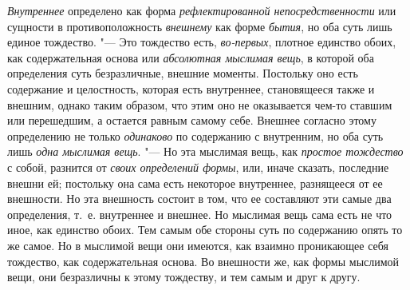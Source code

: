 {\em Внутреннее} определено как форма
{\em рефлектированной непосредственности} или сущности
в противоположность {\em внешнему} как форме
{\em бытия}, но оба суть лишь единое тождество. "--- Это
тождество есть, {\em во-первых}, плотное единство
обоих, как содержательная основа или {\em абсолютная
мыслимая вещь}, в которой оба определения суть безразличные, внешние
моменты. Постольку оно есть содержание и целостность, которая есть
внутреннее, становящееся также и внешним, однако таким образом, что этим
оно не оказывается чем-то ставшим или перешедшим, а остается равным самому
себе. Внешнее согласно этому определению не только
{\em одинаково} по содержанию с внутренним, но оба суть
лишь {\em одна мыслимая вещь}. "--- Но эта мыслимая вещь,
как {\em простое тождество} с собой, разнится от
{\em своих определений формы}, или, иначе сказать,
последние внешни ей; постольку она сама есть некоторое внутреннее,
разнящееся от ее внешности. Но эта внешность состоит в том, что ее
составляют эти самые два определения, т.~е. внутреннее и внешнее. Но
мыслимая вещь сама есть не что иное, как единство обоих. Тем самым обе
стороны суть по содержанию опять то же самое. Но в мыслимой вещи они
имеются, как взаимно проникающее себя тождество, как содержательная основа.
Во внешности же, как формы мыслимой вещи, они безразличны к этому
тождеству, и тем самым и друг к другу.

